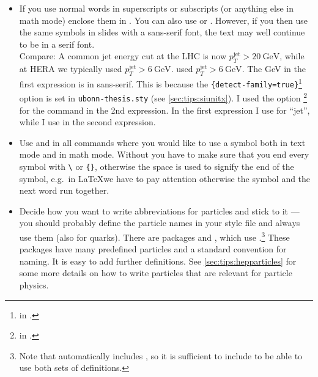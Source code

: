 \begin{itemize}
\item If you use normal words in superscripts or subscripts (or
  anything else in math mode) enclose them in . You can
  also use  or . However, if you then use
  the same symbols in slides with a sans-serif font, the text may well
  continue to be in a
  serif font.\\
  {\sffamily Compare: A common jet energy cut at the LHC is now
    $p_{T}^{\text{jet}} > \SI{20}{\GeV}$, while at HERA we typically
     {%
      used $p_{T}^{\mathrm{jet}} > \SI[obeyfamily=false]{6}{\GeV}$.
    }{%
      used $p_{T}^{\mathrm{jet}} > \SI[detect-family=false]{6}{\GeV}$.
    }}
  The \si{\GeV} in the first expression is in sans-serif. This is
  because the
  \texttt{\{detect-family=true\}}\footnote{
    in .} option is set in \texttt{ubonn-thesis.sty}
  (see \cref{sec:tips:siunitx}).  I used the option
  \footnote{ in .} for the  command in the 2nd expression.
  In the first expression I use  for \enquote{jet}, while
  I use  in the second expression.
  
\item Use  and
   in all commands where you would
  like to use a symbol both in text mode and in math mode. Without
   you have to make sure that you end every symbol with
  \texttt{\textbackslash} or \texttt{\{\}}, otherwise the space is used
  to signify the end of the symbol, e.g.\ in \LaTeX we have to pay
  attention otherwise the symbol and the next word run together.

\item Decide how you want to write abbreviations for particles and
  stick to it --- you should probably define the particle names in your
  style file and always use them (also for quarks).
  There are packages  and ,
  which use .\footnote{%
    Note that  automatically includes ,
    so it is sufficient to include  to be able to use both sets of definitions.}
  These packages have many predefined particles and a standard convention for naming.
  It is easy to add further definitions.
  See \cref{sec:tips:hepparticles} for some more details on how to write particles
  that are relevant for particle physics.


\end{itemize}
